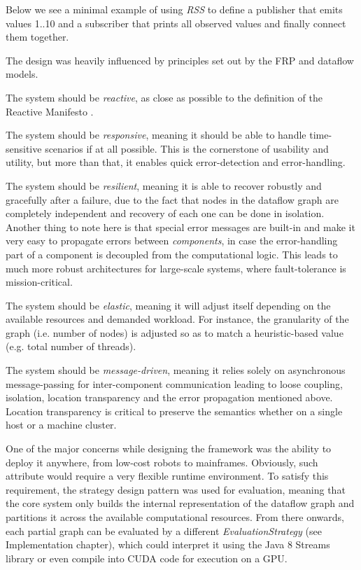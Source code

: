 \documentclass{dithesis}
\begin{document}
Below we see a minimal example of using \textit{RSS} to define a publisher that emits values 1..10 and a subscriber that prints all observed values and finally connect them together.



The design was heavily influenced by principles set out by the FRP and dataflow models. 


The system should be \textit{reactive}, as close as possible to the definition of the Reactive Manifesto \cite{manifesto}. 

The system should be \textit{responsive}, meaning it should be able to handle time-sensitive scenarios if at all possible. This is the cornerstone of usability and utility, but more than that, it enables quick error-detection and error-handling.

The system should be \textit{resilient}, meaning it is able to recover robustly and gracefully after a failure, due to the fact that nodes in the dataflow graph are completely independent and recovery of each one can be done in isolation. Another thing to note here is that special error messages are built-in and make it very easy to propagate errors between \textit{components}, in case the error-handling part of a component is decoupled from the computational logic. This leads to much more robust architectures for large-scale systems, where fault-tolerance is mission-critical.

The system should be \textit{elastic}, meaning it will adjust itself depending on the available resources and demanded workload. For instance, the granularity of the graph (i.e. number of nodes) is adjusted so as to match a heuristic-based value (e.g. total number of threads).

The system should be \textit{message-driven}, meaning it relies solely on asynchronous message-passing for inter-component communication leading to loose coupling, isolation, location transparency and the error propagation mentioned above. Location transparency is critical to preserve the semantics whether on a single host or a machine cluster. 



One of the major concerns while designing the framework was the ability to deploy it anywhere, from low-cost robots to mainframes. Obviously, such attribute would require a very flexible runtime environment. To satisfy this requirement, the strategy design pattern was used for evaluation, meaning that the core system only builds the internal representation of the dataflow graph and partitions it across the available computational resources. From there onwards, each partial graph can be evaluated by a different \textit{EvaluationStrategy} (see Implementation chapter), which could interpret it using the Java 8 Streams library\cite{java_streams} or even compile into CUDA code for execution on a GPU.
\end{document}
